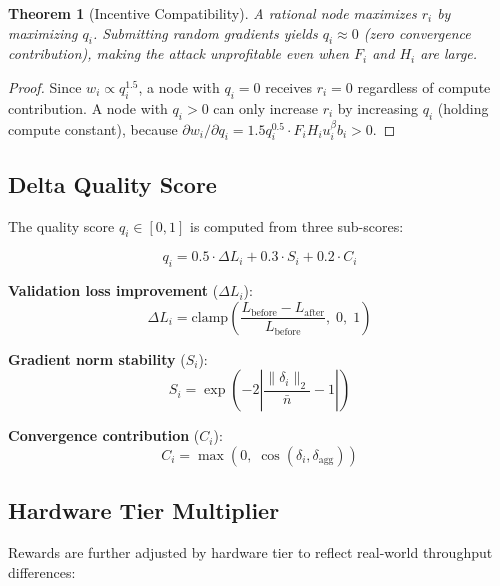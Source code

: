 \documentclass[11pt,letterpaper]{article}
\newtheorem{theorem}{Theorem}[section]
\begin{document}
\begin{theorem}[Incentive Compatibility]
A rational node maximizes $r_i$ by maximizing $q_i$.  Submitting random gradients yields $q_i \approx 0$ (zero convergence contribution), making the attack unprofitable even when $F_i$ and $H_i$ are large.
\end{theorem}

\begin{proof}
Since $w_i \propto q_i^{1.5}$, a node with $q_i = 0$ receives $r_i = 0$ regardless of compute contribution.  A node with $q_i > 0$ can only increase $r_i$ by increasing $q_i$ (holding compute constant), because $\partial w_i / \partial q_i = 1.5 q_i^{0.5} \cdot F_i H_i u_i^\beta b_i > 0$.
\end{proof}

\subsection{Delta Quality Score}
\label{sec:quality}

The quality score $q_i \in [0, 1]$ is computed from three sub-scores:

\begin{equation}
    q_i = 0.5 \cdot \Delta L_i + 0.3 \cdot S_i + 0.2 \cdot C_i
\end{equation}

\textbf{Validation loss improvement} ($\Delta L_i$):
\begin{equation}
    \Delta L_i = \text{clamp}\!\left(\frac{L_{\text{before}} - L_{\text{after}}}{L_{\text{before}}}, \; 0, \; 1\right)
\end{equation}

\textbf{Gradient norm stability} ($S_i$):
\begin{equation}
    S_i = \exp\!\left(-2\left|\frac{\|\delta_i\|_2}{\bar{n}} - 1\right|\right)
\end{equation}

\textbf{Convergence contribution} ($C_i$):
\begin{equation}
    C_i = \max\!\left(0, \; \cos(\delta_i, \delta_{\text{agg}})\right)
\end{equation}

\subsection{Hardware Tier Multiplier}

Rewards are further adjusted by hardware tier to reflect real-world throughput differences:
\end{document}
